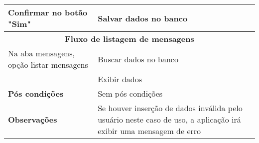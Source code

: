 \begin{center}
\begin{tabular}{ |p{7cm}|p{7cm}| }
 \hline
 Confirmar no botão "Sim" & Salvar dados no banco \\
 \hline
 \multicolumn{2}{|c|}{\textbf{Fluxo de listagem de mensagens} } \\
 \hline 
 Na aba mensagens, opção listar mensagens & Buscar dados no banco \\
 \hline
 & Exibir dados\\
 \hline
 \textbf{Pós condições} & Sem pós condições \\
 \hline
 \textbf{Observações} & Se houver inserção de dados inválida pelo usuário neste caso de uso, a aplicação irá exibir uma mensagem de erro\\
 \hline
\end{tabular}
\end{center}